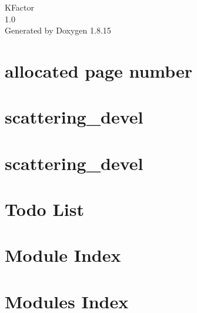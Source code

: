 \let\mypdfximage\pdfximage\def\pdfximage{\immediate\mypdfximage}\documentclass[twoside]{book}
\newcommand{\+}{\discretionary{\mbox{\scriptsize$\hookleftarrow$}}{}{}}
\newcommand{\clearemptydoublepage}{%
  \newpage{\pagestyle{empty}\cleardoublepage}%
}
\begin{document}
\hypersetup{pageanchor=false,
             bookmarksnumbered=true,
             pdfencoding=unicode
            }
\begin{titlepage}
\vspace*{7cm}
\begin{center}%
{\Large K\+Factor \\[1ex]\large 1.\+0 }\\
\vspace*{1cm}
{\large Generated by Doxygen 1.8.15}\\
\end{center}
\end{titlepage}
\clearemptydoublepage
{}
\tableofcontents
\clearemptydoublepage
{}
\hypersetup{pageanchor=true}

\chapter{allocated page number}
\label{returned}

\chapter{scattering\+\_\+devel}
\label{md__Users_archanar_Kinematic_factor_compute_Kfactors_README}

\chapter{scattering\+\_\+devel}
\label{md__Users_archanar_Kinematic_factor_compute_Kfactors_devel_README}

\chapter{Todo List}
\label{todo}

\chapter{Module Index}

\chapter{Modules Index}

\end{document}
